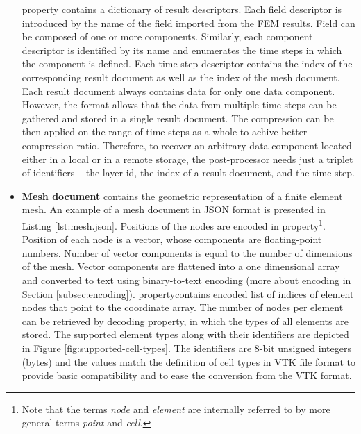 \begin{itemize}
     property contains a dictionary of result descriptors. Each field descriptor is introduced by the name of the field imported from the FEM results. Field can be composed of one or more components. Similarly, each component descriptor is identified by its name and enumerates the time steps in which the component is defined. Each time step descriptor contains the index of the corresponding result document as well as the index of the mesh document. Each result document always contains data for only one data component. However, the format allows that the data from multiple time steps can be gathered and stored in a single result document. The compression can be then applied on the range of time steps as a whole to achive better compression ratio. Therefore, to recover an arbitrary data component located either in a local or in a remote storage, the post-processor needs just a triplet of identifiers -- the layer id, the index of a result document, and the time step.

    \item \textbf{Mesh document} contains the geometric representation of a finite element mesh. An example of a mesh document in JSON format is presented in Listing \ref{lst:mesh.json}. Positions of the nodes are encoded in  property\footnote{Note that the terms \textit{node} and \textit{element} are internally referred to by more general terms \textit{point} and \textit{cell}.\label{foot:points-cells}}. Position of each node is a vector, whose components are floating-point numbers. Number of vector components is equal to the number of dimensions of the mesh. Vector components are flattened into a one dimensional array and converted to text using binary-to-text encoding (more about encoding in Section \ref{subsec:encoding}).  property contains encoded list of indices of element nodes that point to the coordinate array. The number of nodes per element can be retrieved by decoding  property, in which the types of all elements are stored. The supported element types along with their identifiers are depicted in Figure \ref{fig:supported-cell-types}. The identifiers are 8-bit unsigned integers (bytes) and the values match the definition of cell types in VTK file format \cite{VTK2015} to provide basic compatibility and to ease the conversion from the VTK format.
    

\end{itemize}
